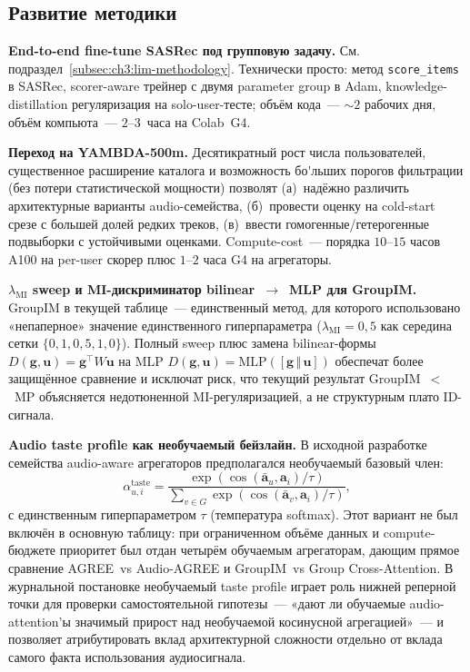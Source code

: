\subsection{Развитие методики}\label{subsec:ch3:lim-method}

\textbf{End-to-end fine-tune SASRec под групповую задачу.} См. подраздел~\ref{subsec:ch3:lim-methodology}. Технически просто: метод \texttt{score\_items} в SASRec, scorer-aware трейнер с двумя parameter group в Adam, knowledge-distillation регуляризация на solo-user-тесте; объём кода~--- $\sim 2$ рабочих дня, объём компьюта~--- $2$--$3$~часа на Colab~G4.

\textbf{Переход на YAMBDA-500m.} Десятикратный рост числа пользователей, существенное расширение каталога и возможность бо\'{}льших порогов фильтрации (без потери статистической мощности) позволят (а)~надёжно различить архитектурные варианты audio-семейства, (б)~провести оценку на cold-start срезе с большей долей редких треков, (в)~ввести гомогенные/гетерогенные подвыборки с устойчивыми оценками. Compute-cost~--- порядка $10$--$15$ часов A100 на per-user скорер плюс $1$--$2$ часа G4 на агрегаторы.

\textbf{$\lambda_{\mathrm{MI}}$ sweep и MI-дискриминатор bilinear~$\to$~MLP для GroupIM.} GroupIM в текущей таблице~--- единственный метод, для которого использовано «непаперное» значение единственного гиперпараметра ($\lambda_{\mathrm{MI}} = 0{,}5$ как середина сетки $\{0{,}1, 0{,}5, 1{,}0\}$). Полный sweep плюс замена bilinear-формы $D(\mathbf{g}, \mathbf{u}) = \mathbf{g}^\top W \mathbf{u}$ на MLP $D(\mathbf{g}, \mathbf{u}) = \mathrm{MLP}([\mathbf{g} \,\Vert\, \mathbf{u}])$ обеспечат более защищённое сравнение и исключат риск, что текущий результат GroupIM~$<$~MP объясняется недотюненной MI-регуляризацией, а не структурным плато ID-сигнала.

\textbf{Audio taste profile как необучаемый бейзлайн.} В исходной разработке семейства audio-aware агрегаторов предполагался необучаемый базовый член:
\begin{equation*}
    \alpha_{u, i}^{\mathrm{taste}} = \frac{\exp\!\left( \cos(\bar{\mathbf{a}}_u, \mathbf{a}_i) / \tau \right)}{\sum_{v \in G} \exp\!\left( \cos(\bar{\mathbf{a}}_v, \mathbf{a}_i) / \tau \right)},
\end{equation*}
с единственным гиперпараметром $\tau$ (температура softmax). Этот вариант не был включён в основную таблицу: при ограниченном объёме данных и compute-бюджете приоритет был отдан четырём обучаемым агрегаторам, дающим прямое сравнение AGREE~vs Audio-AGREE и GroupIM~vs Group Cross-Attention. В журнальной постановке необучаемый taste profile играет роль нижней реперной точки для проверки самостоятельной гипотезы~--- «дают ли обучаемые audio-attention'ы значимый прирост над необучаемой косинусной агрегацией»~--- и позволяет атрибутировать вклад архитектурной сложности отдельно от вклада самого факта использования аудиосигнала.

